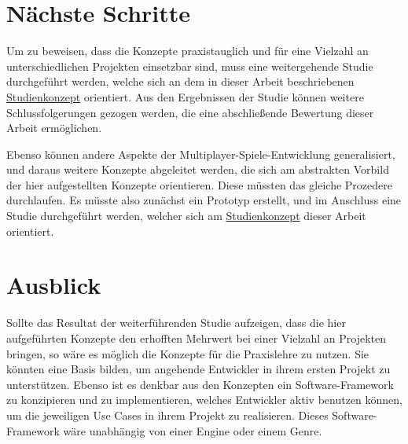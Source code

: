 \section{Nächste Schritte}

Um zu beweisen, dass die Konzepte praxistauglich und für eine Vielzahl an unterschiedlichen Projekten einsetzbar sind, muss eine weitergehende Studie durchgeführt werden, welche sich an dem in dieser Arbeit beschriebenen \hyperref[studienkonzept]{Studienkonzept} orientiert. Aus den Ergebnissen der Studie können weitere Schlussfolgerungen gezogen werden, die eine abschließende Bewertung dieser Arbeit ermöglichen. 

Ebenso können andere Aspekte der Multiplayer-Spiele-Entwicklung generalisiert, und daraus weitere Konzepte abgeleitet werden, die sich am abstrakten Vorbild der hier aufgestellten Konzepte orientieren. Diese müssten das gleiche Prozedere durchlaufen. Es müsste also zunächst ein Prototyp erstellt, und im Anschluss eine Studie durchgeführt werden, welcher sich am \hyperref[studienkonzept]{Studienkonzept} dieser Arbeit orientiert.

\section{Ausblick}

Sollte das Resultat der weiterführenden Studie aufzeigen, dass die hier aufgeführten Konzepte den erhofften Mehrwert bei einer Vielzahl an Projekten bringen, so wäre es möglich die Konzepte für die Praxislehre zu nutzen. Sie könnten eine Basis bilden, um angehende Entwickler in ihrem ersten Projekt zu unterstützen. Ebenso ist es denkbar aus den Konzepten ein Software-Framework zu konzipieren und zu implementieren, welches Entwickler aktiv benutzen können, um die jeweiligen Use Cases in ihrem Projekt zu realisieren. Dieses Software-Framework wäre unabhängig von einer Engine oder einem Genre.